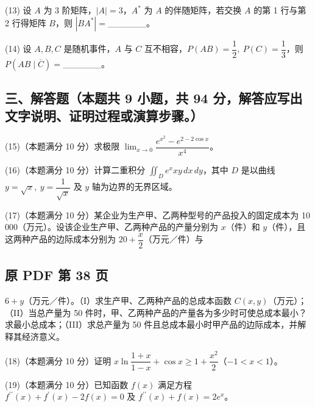 \documentclass[UTF8,12pt]{ctexart}
\begin{document}
(13) 设 \(\displaystyle A\) 为 3 阶矩阵，\(\displaystyle |A|=3\)，\(\displaystyle A^*\) 为 \(\displaystyle A\) 的伴随矩阵，若交换 \(\displaystyle A\) 的第 1 行与第 2 行得矩阵 \(\displaystyle B\)，则 \(\displaystyle |BA^*|=\)\_\_\_\_\_\_。


(14) 设 \(\displaystyle A,\allowbreak B,\allowbreak C\) 是随机事件，\(\displaystyle A\) 与 \(\displaystyle C\) 互不相容，\(\displaystyle P(AB)=\dfrac{\displaystyle 1}{\displaystyle 2},\allowbreak \ P(C)=\dfrac{\displaystyle 1}{\displaystyle 3}\)，则 \(\displaystyle P(AB\mid\overline C)=\)\_\_\_\_\_\_。


\subsection*{三、解答题（本题共 9 小题，共 94 分，解答应写出文字说明、证明过程或演算步骤。）}

(15)（本题满分 10 分）求极限 \(\displaystyle \lim_{x\to0}\dfrac{\displaystyle e^{x^2}-e^{2-2\cos x}}{\displaystyle x^4}\)。


(16)（本题满分 10 分）计算二重积分 \(\displaystyle \iint_D e^xxy\,dx\,dy\)，其中 \(\displaystyle D\) 是以曲线 \(\displaystyle y=\sqrt x,\allowbreak \ y=\dfrac{\displaystyle 1}{\displaystyle \sqrt x}\) 及 \(\displaystyle y\) 轴为边界的无界区域。


(17)（本题满分 10 分）某企业为生产甲、乙两种型号的产品投入的固定成本为 10 000（万元）。设该企业生产甲、乙两种产品的产量分别为 \(\displaystyle x\)（件）和 \(\displaystyle y\)（件），且这两种产品的边际成本分别为 \(\displaystyle 20+\dfrac{\displaystyle x}{\displaystyle 2}\)（万元／件）与 


\clearpage

\subsection*{原 PDF 第 38 页}

\(\displaystyle 6+y\)（万元／件）。（I）求生产甲、乙两种产品的总成本函数 \(\displaystyle C(x,\allowbreak y)\)（万元）；（II）当总产量为 50 件时，甲、乙两种产品的产量各为多少时可使总成本最小？求最小总成本；（III）求总产量为 50 件且总成本最小时甲产品的边际成本，并解释其经济意义。


(18)（本题满分 10 分）证明 \(\displaystyle x\ln\dfrac{\displaystyle 1+x}{\displaystyle 1-x}+\cos x\geq1+\dfrac{\displaystyle x^2}{\displaystyle 2}\)（\(\displaystyle -1<x<1\)）。


(19)（本题满分 10 分）已知函数 \(\displaystyle f(x)\) 满足方程 \(\displaystyle f^{\prime\prime}(x)+f^{\prime}(x)-2f(x)=0\) 及 \(\displaystyle f^{\prime\prime}(x)+f(x)=2e^x\)。
\end{document}

